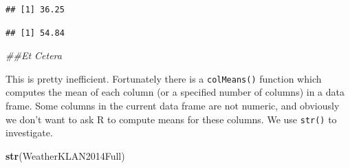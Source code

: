 \documentclass[
]{krantz}
\newenvironment{Shaded}{\begin{snugshade}}{\end{snugshade}}
\newcommand{\CommentTok}[1]{\textcolor[rgb]{0.56,0.35,0.01}{\textit{#1}}}
\newcommand{\KeywordTok}[1]{\textcolor[rgb]{0.13,0.29,0.53}{\textbf{#1}}}
\newcommand{\NormalTok}[1]{#1}
\newcommand{\OperatorTok}[1]{\textcolor[rgb]{0.81,0.36,0.00}{\textbf{#1}}}
\begin{document}
\begin{verbatim}
## [1] 36.25
\end{verbatim}

\begin{Shaded}
\end{Shaded}

\begin{verbatim}
## [1] 54.84
\end{verbatim}

\begin{Shaded}
\begin{Highlighting}[]
\CommentTok{\#\#Et Cetera}
\end{Highlighting}
\end{Shaded}

This is pretty inefficient. Fortunately there is a \texttt{colMeans()} function which computes the mean of each column (or a specified number of columns) in a data frame. Some columns in the current data frame are not numeric, and obviously we don't want to ask R to compute means for these columns. We use \texttt{str()} to investigate.

\begin{Shaded}
\begin{Highlighting}[]
\KeywordTok{str}\NormalTok{(WeatherKLAN2014Full)}
\end{Highlighting}
\end{Shaded}
\end{document}
